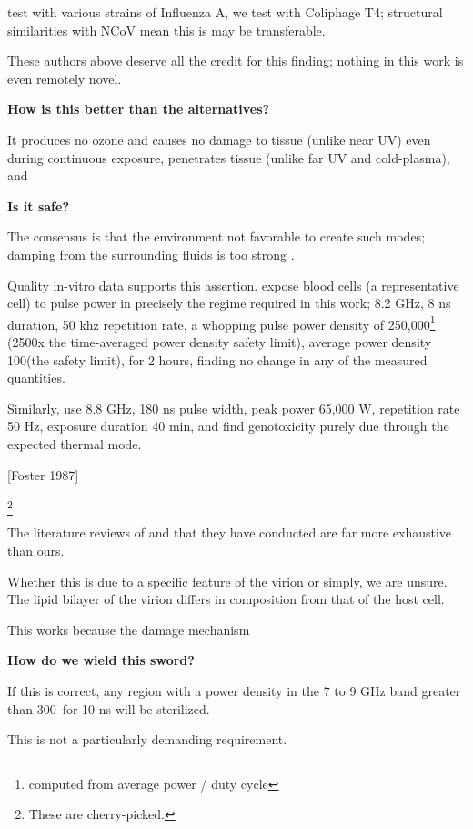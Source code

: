 \documentclass[fleqn,10pt]{paper}
\begin{document}
\cite{Efficient2015} test with various strains of Influenza A, we test with Coliphage T4; structural similarities with NCoV mean this is may be transferable.



These authors above deserve all the credit for this finding; nothing in this work is even remotely novel.

{\Large \textbf{How is this better than the alternatives?}}

It produces no ozone and causes no damage to tissue (unlike near UV) even during continuous exposure, penetrates tissue (unlike far UV and cold-plasma), and 

{\Large \textbf{Is it safe?}}

The consensus is that the environment not favorable to create such modes; damping from the surrounding fluids is too strong \cite{Vibrational2002}. 

Quality in-vitro data supports this assertion. \cite{Cytogenetic2006} expose blood cells (a representative cell) to pulse power in precisely the regime required in this work; 8.2 GHz, 8 ns duration, 50 khz repetition rate, a whopping pulse power density of 250,000\Wsqm\footnote{computed from average power / duty cycle} (2500x the time-averaged power density safety limit), average power density 100\Wsqm (the safety limit), for 2 hours, finding no change in any of the measured quantities. 

Similarly, \cite{DNA2004} use 8.8 GHz, 180 ns pulse width, peak power 65,000 W, repetition rate 50 Hz, exposure duration 40 min, and find genotoxicity purely due through the expected thermal mode. 

[Foster 1987]

\footnote{These are cherry-picked.}

The literature reviews of \cite{ICNIRP2020} and \cite{C95} that they have conducted are far more exhaustive than ours.

Whether this is due to a specific feature of the virion or simply, we are unsure. The lipid bilayer of the virion differs in composition from that of the host cell.

This works because the damage mechanism 

{\Large \textbf{How do we wield this sword?}}

If this is correct, any region with a power density in the 7 to 9 GHz band greater than 300\Wsqm \ for 10 ns will be sterilized. 

This is not a particularly demanding requirement. 
\end{document}
